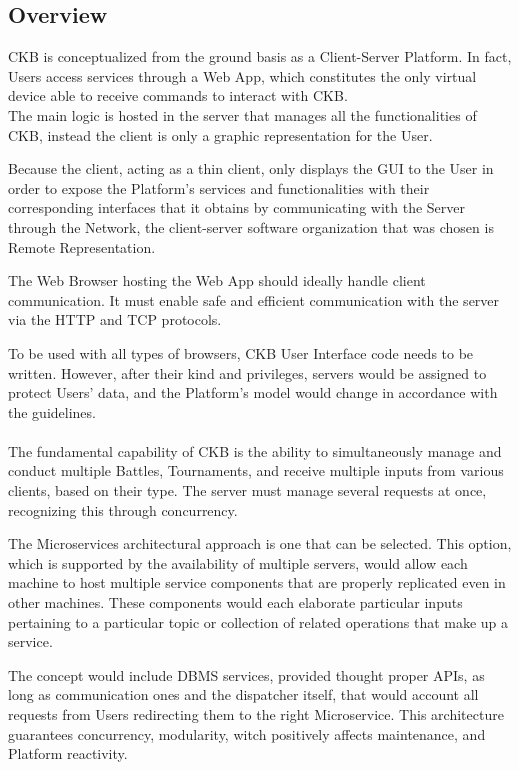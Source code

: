 \subsection{Overview}
CKB is conceptualized from the ground basis as a Client-Server Platform. In fact, Users access services through a Web App, which constitutes the only virtual device able to receive commands to interact 
with CKB.
\\
The main logic is hosted in the server that manages all the functionalities of CKB, instead the client is only a graphic representation for the User.

Because the client, acting as a thin client, only displays the GUI to the User in order to expose the Platform's services and functionalities with their corresponding interfaces that it obtains by communicating with the Server through 
the Network, the client-server software organization that was chosen is Remote Representation.

The Web Browser hosting the Web App should ideally handle client communication. It must enable safe and efficient communication with the server via the HTTP and TCP protocols. 

To be used with all types of browsers, CKB User Interface code needs to be written. However, after their kind and privileges, servers would be assigned to protect Users' data, and the Platform's model would change in accordance 
with the guidelines.\\
\\
The fundamental capability of CKB is the ability to simultaneously manage and conduct multiple Battles, Tournaments, and receive multiple inputs from various clients, based on their type. 
The server must manage several requests at once, recognizing this through concurrency.

The Microservices architectural approach is one that can be selected. This option, which is supported by the availability of multiple servers, would allow each machine to host multiple service components that are properly 
replicated even in other machines. These components would each elaborate particular inputs pertaining to a particular topic or collection of related operations that make up a service.

The concept would include DBMS services, provided thought proper APIs, as long as communication ones and the dispatcher itself, that would account all requests from Users redirecting them to the 
right Microservice. This architecture guarantees concurrency, modularity, witch positively affects maintenance, and Platform reactivity.

